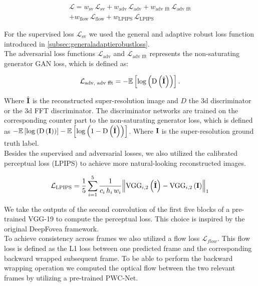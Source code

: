 \documentclass[10pt,twocolumn,letterpaper]{article}
\newcommand{\Tensor}[1]{\boldsymbol{\mathrm{\MakeUppercase{#1}}}}
\newcommand{\Mean}[1]{\mathbb{E}\left[#1\right]}
\begin{document}
\begin{multline} \label{eq:loss}
    \mathcal{L}=w_{\text{sv}}\,\mathcal{L}_{\text{sv}} + w_{\text{adv}}\,\mathcal{L}_{\text{adv}} + w_{\text{adv fft}}\,\mathcal{L}_{\text{adv fft}}\\
    + w_{\text{flow}}\,\mathcal{L}_{\text{flow}} + w_{\text{LPIPS}}\,\mathcal{L}_{\text{LPIPS}}    
\end{multline}

For the supervised loss $\mathcal{L}_{\text{sv}}$ we used the general and adaptive robust loss function introduced in \ref{subsec:generaladaptierobustloss}.\cite{adaptiveroubustloss}\\
The adversarial loss functions $\mathcal{L}_{\text{adv}}$ and $\mathcal{L}_{\text{adv fft}}$ represents the non-saturating generator GAN loss, which is defined as: \cite{gan}

\begin{equation}
    \mathcal{L}_{\text{adv, adv fft}}=-\Mean{\log \left(\operatorname{D}\left(\hat{\Tensor{I}}\right)\right)}.
\end{equation}

Where $\hat{\Tensor{I}}$ is the reconstructed super-resolution image and $D$ the 3d discriminator or the 3d FFT discriminator. The discriminator networks are trained on the corresponding counter part to the non-saturating generator loss, which is defined as $-\Mean{\log\left(\operatorname{D}\left(\Tensor{I}\right)\right)}-\Mean{\log\left(1-\operatorname{
D}\left(\hat{\Tensor{I}}\right)\right)}$. Where $\Tensor{I}$ is the super-resolution ground truth label. \cite{gan}\\
Besides the supervised and adversarial losses, we also utilized the calibrated perceptual loss (LPIPS) \cite{perceptual} to achieve more natural-looking reconstructed images.

\begin{equation}
    \mathcal{L}_{\text{LPIPS}} = \frac{1}{5}\sum_{i=1}^{5}\frac{1}{c_{i}\,h_{i}\,w_{i}}\norm{\operatorname{VGG}_{i,2}\left(\hat{\Tensor{I}}\right) - \operatorname{VGG}_{i,2}\left(\Tensor{I}\right)}_{1}
\end{equation}

We take the outputs of the second convolution of the first five blocks of a pre-trained VGG-19 to compute the perceptual loss. This choice is inspired by the original DeepFovea framework. \cite{vgg, deepfovea}\\
To achieve consistency across frames we also utilized a flow loss $\mathcal{L}_{flow}$. This flow loss is defined as the L1 loss between one predicted frame and the corresponding backward wrapped subsequent frame. To be able to perform the backward wrapping operation we computed the optical flow between the two relevant frames by utilizing a pre-trained PWC-Net. \cite{deepfovea, pwcnet}
\end{document}
